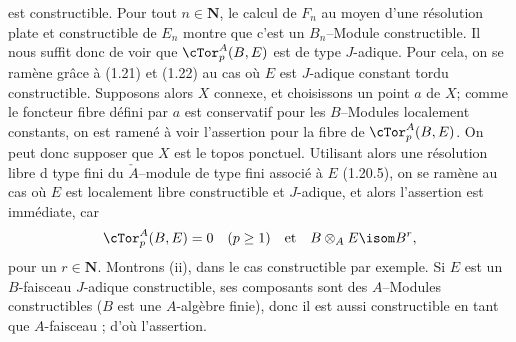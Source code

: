 est constructible. Pour tout $n \in \mathbf{N}$, le calcul de $F_n$ au moyen d'une résolution plate et constructible de $E_n$ montre que c'est un $B_n$--Module constructible. Il nous suffit donc de voir que $\cTor^A_p(B, E)$ est de type $J$-adique. Pour cela, on se ramène grâce à (1.21) et (1.22) au cas où $E$ est $J$-adique constant tordu constructible. Supposons alors $X$ connexe, et choisissons un point $a$ de $X$; comme le foncteur fibre défini par $a$ est conservatif pour les $B$--Modules localement constants, on est ramené à voir l'assertion pour la fibre de $\cTor^A_p(B, E)$. On peut donc supposer que $X$ est le topos ponctuel. Utilisant alors une résolution libre d type fini du $\check{A}$--module de type fini associé à $E$ (1.20.5), on se ramène au cas où $E$ est localement libre constructible et $J$-adique, et alors l'assertion est immédiate, car
$$
\cTor^A_p(B, E) = 0 \quad (p \geq 1) \quad \text{et} \quad B \otimes_A E \isom B^r,
$$
pour un $r \in \mathbf{N}$. Montrons (ii), dans le cas constructible par exemple. Si $E$ est un $B$-faisceau $J$-adique constructible, ses composants sont des $A$--Modules constructibles ($B$ est une $A$-algèbre finie), donc il est aussi constructible en tant que $A$-faisceau ; d'où l'assertion.

